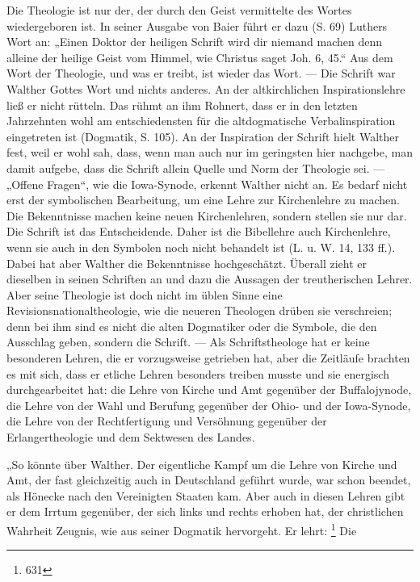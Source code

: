 Die Theologie ist nur der, der durch den Geist vermittelte des Wortes wiedergeboren ist. In seiner Ausgabe von Baier führt er dazu (S. 69) Luthers Wort an: „Einen Doktor der heiligen Schrift wird dir niemand machen denn alleine der heilige Geist vom Himmel, wie Christus saget Joh. 6, 45.“ Aus dem Wort der Theologie, und was er treibt, ist wieder das Wort. — Die Schrift war Walther Gottes Wort und nichts anderes. An der altkirchlichen Inspirationslehre ließ er nicht rütteln. Das rühmt an ihm Rohnert, dass er in den letzten Jahrzehnten wohl am entschiedensten für die altdogmatische Verbalinspiration eingetreten ist (Dogmatik, S. 105). An der Inspiration der Schrift hielt Walther fest, weil er wohl sah, dass, wenn man auch nur im geringsten hier nachgebe, man damit aufgebe, dass die Schrift allein Quelle und Norm der Theologie sei. — „Offene Fragen“, wie die Iowa-Synode, erkennt Walther nicht an. Es bedarf nicht erst der symbolischen Bearbeitung, um eine Lehre zur Kirchenlehre zu machen. Die Bekenntnisse machen keine neuen Kirchenlehren, sondern stellen sie nur dar. Die Schrift ist das Entscheidende. Daher ist die Bibellehre auch Kirchenlehre, wenn sie auch in den Symbolen noch nicht behandelt ist (L. u. W. 14, 133 ff.). Dabei hat aber Walther die Bekenntnisse hochgeschätzt. Überall zieht er dieselben in seinen Schriften an und dazu die Aussagen der treutherischen Lehrer. Aber seine Theologie ist doch nicht im üblen Sinne eine Revisionsnationaltheologie, wie die neueren Theologen drüben sie verschreien; denn bei ihm sind es nicht die alten Dogmatiker oder die Symbole, die den Ausschlag geben, sondern die Schrift. — Als Schriftstheologe hat er keine besonderen Lehren, die er vorzugsweise getrieben hat, aber die Zeitläufe brachten es mit sich, dass er etliche Lehren besonders treiben musste und sie energisch durchgearbeitet hat: die Lehre von Kirche und Amt gegenüber der Buffalojynode, die Lehre von der Wahl und Berufung gegenüber der Ohio- und der Iowa-Synode, die Lehre von der Rechtfertigung und Versöhnung gegenüber der Erlangertheologie und dem Sektwesen des Landes.

„So könnte über Walther. Der eigentliche Kampf um die Lehre von Kirche und Amt, der fast gleichzeitig auch in Deutschland geführt wurde, war schon beendet, als Hönecke nach den Vereinigten Staaten kam. Aber auch in diesen Lehren gibt er dem Irrtum gegenüber, der sich links und rechts erhoben hat, der christlichen Wahrheit Zeugnis, wie aus seiner Dogmatik hervorgeht. Er lehrt: \footnote{631} Die

